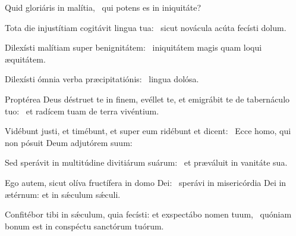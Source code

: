 \item Quid gloriáris in malítia,~\psstar{} qui potens es in iniquitáte?

\item Tota die injustítiam cogitávit lingua tua:~\psstar{} sicut novácula acúta fecísti dolum.

\item Dilexísti malítiam super benignitátem:~\psstar{} iniquitátem magis quam loqui æquitátem.

\item Dilexísti ómnia verba præcipitatiónis:~\psstar{} lingua dolósa.

\item Proptérea Deus déstruet te in finem, evéllet te, et emigrábit te de tabernáculo tuo:~\psstar{} et radícem tuam de terra vivéntium.

\item Vidébunt justi, et timébunt, et super eum ridébunt et dicent:~\psstar{} Ecce homo, qui non pósuit Deum adjutórem suum:

\item Sed sperávit in multitúdine divitiárum suárum:~\psstar{} et præváluit in vanitáte sua.

\item Ego autem, sicut olíva fructífera in domo Dei:~\psstar{} sperávi in misericórdia Dei in ætérnum: et in sǽculum sǽculi.

\item Confitébor tibi in sǽculum, quia fecísti: et exspectábo nomen tuum,~\psstar{} quóniam bonum est in conspéctu sanctórum tuórum.